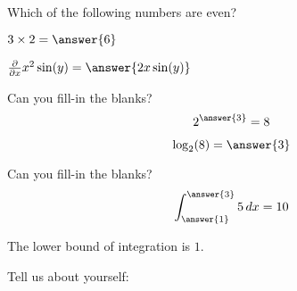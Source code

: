 \documentclass{ximera}
\begin{document}
\begin{problem}  
  Which of the following numbers are even?  
  \begin{selectAll}  
  \end{selectAll}  
\end{problem}


\begin{problem}  
  $3\times 2 = \answer{6}$  
\end{problem} 

\begin{problem}  
  $\frac{\partial}{\partial x} x^2\sin(y) =  \answer{2x\sin(y)}$  
\end{problem} 

\begin{problem}
  Can you fill-in the blanks?
  \[
  2^{\answer{3}} = 8
  \]
  \begin{problem}
    \[
    \log_2(8) = \answer{3}
    \]
  \end{problem}
\end{problem}

\begin{problem}
  Can you fill-in the blanks?
  \[
  \int_{\answer{1}}^{\answer{3}}5 \, d x = 10
  \]
  \begin{hint}
    The lower bound of integration is $1$.
  \end{hint}
\end{problem}



\begin{problem}
  Tell us about yourself:
  \begin{freeResponse}
  \end{freeResponse}
\end{problem}
\end{document}

